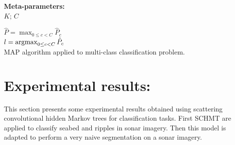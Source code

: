 \documentclass[a4paper,11pt]{report}
\begin{document}
		\begin{center}
			\begin{algorithm}
				\textbf{Meta-parameters:}\\
					$K$; $C$ 
					
				
				$\hat{P}= \max_{0\leq c < C} \hat{P}_{c}$\\
				$l= \mathop{\rm argmax}_{0\leq c < C} \hat{P}_{c}$\\
				
				\caption{MAP algorithm applied to multi-class classification problem.}
				\label{algo:MAP clf}
			\end{algorithm}        
		\end{center}
    
\chapter{Experimental results:}
  \label{chap:Exp}
  This section presents some experimental results obtained using scattering convolutional hidden Markov trees for classification tasks. First SCHMT are applied to classify seabed and ripples in sonar imagery. Then this model is adapted to perform a very naive segmentation on a sonar imagery.
  
\end{document}
